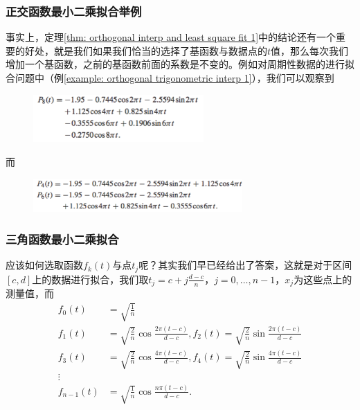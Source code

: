 \documentclass[10pt]{beamer}
\begin{document}
\begin{frame}
\frametitle{正交函数最小二乘拟合举例}
事实上，定理\ref{thm: orthogonal interp and least square fit 1}中的结论还有一个重要的好处，就是我们如果我们恰当的选择了基函数与数据点的$t$值，那么每次我们增加一个基函数，之前的基函数前面的系数是不变的。例如对周期性数据的进行拟合问题中（例\ref{example: orthogonal trigonometric interp 1}），我们可以观察到
\begin{figure}
\includegraphics[width=6.5cm]{figs/10-3-2_Orthogonal_Interp-1} 
\end{figure}
而
\begin{figure}
\includegraphics[width=8cm]{figs/10-3-2_Orthogonal_Interp-2} 
\end{figure}
\end{frame}


\begin{frame}
\frametitle{三角函数最小二乘拟合}
应该如何选取函数$f_k(t)$与点$t_j$呢？其实我们早已经给出了答案，这就是对于区间$[c,d]$上的数据进行拟合，我们取$t_j = c + j \frac{d-c}{n}$，$j = 0, \ldots, n-1$，$x_j$为这些点上的测量值，而
\begin{align}
f_0(t) &= \sqrt{\frac{1}{n}} \nonumber \\
f_1(t) &= \sqrt{\frac{2}{n}} \cos \frac{2 \pi (t-c)}{d-c}, f_2(t) = \sqrt{\frac{2}{n}} \sin \frac{2 \pi (t-c)}{d-c} \nonumber \\
f_3(t) &= \sqrt{\frac{2}{n}} \cos \frac{4 \pi (t-c)}{d-c}, f_4(t) = \sqrt{\frac{2}{n}} \sin \frac{4 \pi (t-c)}{d-c} \nonumber \\
\vdots \nonumber \\
f_{n-1} (t) &= \sqrt{\frac{1}{n}} \cos \frac{n \pi (t-c)}{d-c}.
\end{align}
\end{frame}
\end{document}

